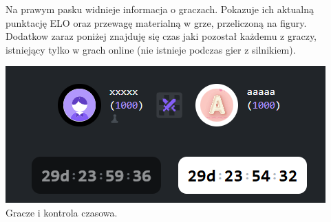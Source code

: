 \documentclass[12pt,a4paper]{article}
\begin{document}
\begin{minipage}[t]{0.45\textwidth} 
    \vspace{0pt} 
    \raggedright 
    Na prawym pasku widnieje informacja o graczach. Pokazuje ich aktualną punktację ELO oraz przewagę materialną w grze, przeliczoną na figury. Dodatkow zaraz poniżej znajduję się czas jaki pozostał każdemu z graczy, istniejący tylko w grach online (nie istnieje podczas gier z silnikiem).
\end{minipage} 
\hfill 
\begin{minipage}[t]{0.45\textwidth} 
    \vspace{0pt} 
    \centering 
    \includegraphics[width=\linewidth]{images/ins_min_players.png} 
    Gracze i kontrola czasowa.
\end{minipage}

\vspace{1cm}
\end{document}
